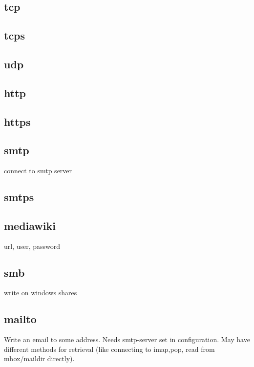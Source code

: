\documentclass[12pt,a4paper]{book}
\begin{document}
\subsection{tcp}
\subsection{tcps}
\subsection{udp}
\subsection{http}
\subsection{https}
\subsection{smtp}
connect to smtp server
\subsection{smtps}
\subsection{mediawiki}
url, user, password
\subsection{smb}
write on windows shares
\subsection{mailto}
Write an email to some address. Needs smtp-server set in configuration.
May have different methods for retrieval (like connecting to imap,pop,
read from mbox/maildir directly).
\end{document}
